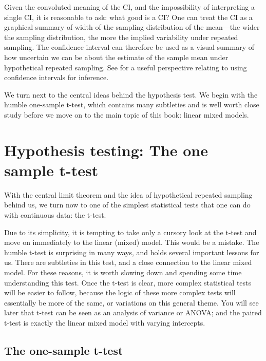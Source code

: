 \documentclass[12pt,]{krantz}
\begin{document}
Given the convoluted meaning of the CI, and the impossibility of interpreting a single CI, it is reasonable to ask: what good is a CI? One can treat the CI as a graphical summary of width of the sampling distribution of the mean---the wider the sampling distribution, the more the implied variability under repeated sampling. The confidence interval can therefore be used as a visual summary of how uncertain we can be about the estimate of the sample mean under hypothetical repeated sampling. See \citet{cumming2014new} for a useful perspective relating to using confidence intervals for inference.

We turn next to the central ideas behind the hypothesis test. We begin with the humble one-sample t-test, which contains many subtleties and is well worth close study before we move on to the main topic of this book: linear mixed models.

\hypertarget{hypothesis-testing-the-one-sample-t-test}{%
\section{Hypothesis testing: The one sample t-test}\label{hypothesis-testing-the-one-sample-t-test}}

With the central limit theorem and the idea of hypothetical repeated sampling behind us, we turn now to one of the simplest statistical tests that one can do with continuous data: the t-test.

Due to its simplicity, it is tempting to take only a cursory look at the t-test and move on immediately to the linear (mixed) model. This would be a mistake. The humble t-test is surprising in many ways, and holds several important lessons for us. There are subtleties in this test, and a close connection to the linear mixed model. For these reasons, it is worth slowing down and spending some time understanding this test. Once the t-test is clear, more complex statistical tests will be easier to follow, because the logic of these more complex tests will essentially be more of the same, or variations on this general theme. You will see later that t-test can be seen as an analysis of variance or ANOVA; and the paired t-test is exactly the linear mixed model with varying intercepts.

\hypertarget{the-one-sample-t-test}{%
\subsection{The one-sample t-test}\label{the-one-sample-t-test}}
\end{document}
